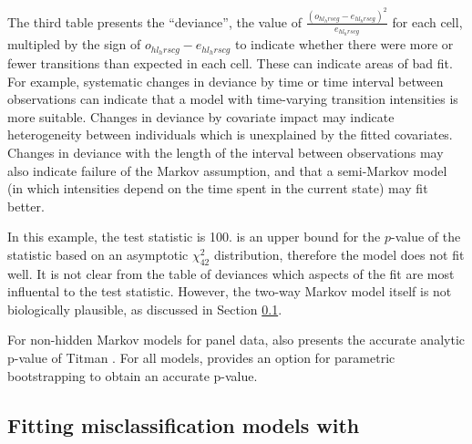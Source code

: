 The third table presents the ``deviance'', the value of
$\frac{(o_{hl_h rscg} - e_{hl_h rscg})^2}{e_{hl_h rscg}}$ for each
cell, multipled by the sign of $o_{hl_h rscg} - e_{hl_h rscg}$ to
indicate whether there were more or fewer transitions than expected in
each cell.  These can indicate areas of bad fit.  For example,
systematic changes in deviance by time or time interval between
observations can indicate that a model with time-varying transition
intensities is more suitable.  Changes in deviance by covariate impact
may indicate heterogeneity between individuals which is unexplained
by the fitted covariates.  Changes in deviance with the length of the
interval between observations may also indicate failure of the Markov
assumption, and that a semi-Markov model (in which intensities depend
on the time spent in the current state) may fit better.

In this example, the test statistic is 100.   is an
upper bound for the $p$-value of the statistic based on an asymptotic
$\chi^2_{42}$ distribution, therefore the model does not fit well.  It
is not clear from the table of deviances which aspects of the fit are
most influental to the test statistic.  However, the two-way Markov
model itself is not biologically plausible, as discussed in
Section \ref{sec:fitting:hmm:misc}.

For non-hidden Markov models for panel data, 
also presents the accurate analytic p-value of
Titman \cite{titman:asympnull}.  For all models,
 provides an option for parametric
bootstrapping to obtain an accurate p-value.


\subsection{Fitting misclassification models with }
\label{sec:fitting:hmm:misc}

